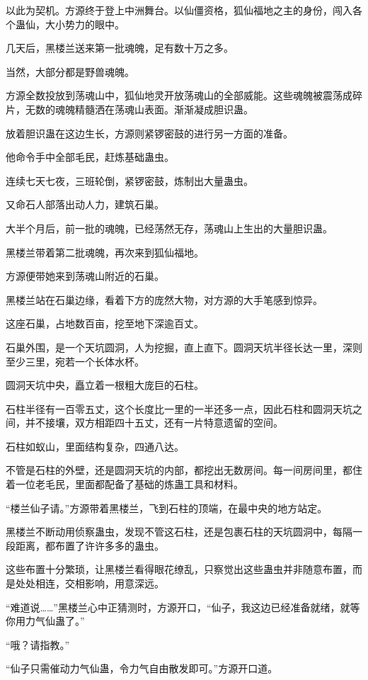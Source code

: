 \begin{this_body}
以此为契机。方源终于登上中洲舞台。以仙僵资格，狐仙福地之主的身份，闯入各个蛊仙，大小势力的眼中。

几天后，黑楼兰送来第一批魂魄，足有数十万之多。

当然，大部分都是野兽魂魄。

方源全数投放到荡魂山中，狐仙地灵开放荡魂山的全部威能。这些魂魄被震荡成碎片，无数的魂魄精髓洒在荡魂山表面。渐渐凝成胆识蛊。

放着胆识蛊在这边生长，方源则紧锣密鼓的进行另一方面的准备。

他命令手中全部毛民，赶炼基础蛊虫。

连续七天七夜，三班轮倒，紧锣密鼓，炼制出大量蛊虫。

又命石人部落出动人力，建筑石巢。

大半个月后，前一批的魂魄，已经荡然无存，荡魂山上生出的大量胆识蛊。

黑楼兰带着第二批魂魄，再次来到狐仙福地。

方源便带她来到荡魂山附近的石巢。

黑楼兰站在石巢边缘，看着下方的庞然大物，对方源的大手笔感到惊异。

这座石巢，占地数百亩，挖至地下深逾百丈。

石巢外围，是一个天坑圆洞，人为挖掘，直上直下。圆洞天坑半径长达一里，深则至少三里，宛若一个长体水杯。

圆洞天坑中央，矗立着一根粗大庞巨的石柱。

石柱半径有一百零五丈，这个长度比一里的一半还多一点，因此石柱和圆洞天坑之间，并不接壤，双方相距四十五丈，还有一片特意遗留的空间。

石柱如蚁山，里面结构复杂，四通八达。

不管是石柱的外壁，还是圆洞天坑的内部，都挖出无数房间。每一间房间里，都住着一位老毛民，里面都配备了基础的炼蛊工具和材料。

“楼兰仙子请。”方源带着黑楼兰，飞到石柱的顶端，在最中央的地方站定。

黑楼兰不断动用侦察蛊虫，发现不管这石柱，还是包裹石柱的天坑圆洞中，每隔一段距离，都布置了许许多多的蛊虫。

这些布置十分繁琐，让黑楼兰看得眼花缭乱，只察觉出这些蛊虫并非随意布置，而是处处相连，交相影响，用意深远。

“难道说……”黑楼兰心中正猜测时，方源开口，“仙子，我这边已经准备就绪，就等你用力气仙蛊了。”

“哦？请指教。”

“仙子只需催动力气仙蛊，令力气自由散发即可。”方源开口道。


\end{this_body}
